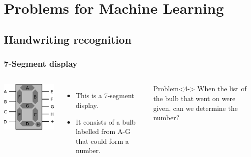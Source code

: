 \documentclass[aspectratio=169]{beamer}
\begin{document}
\section{Problems for Machine Learning}

\subsection{Handwriting recognition}

\begin{frame}
	\frametitle{7-Segment display}
	\begin{columns}
		\includegraphics[width=1.0\textwidth]{imgs/7seg.png}
		\begin{itemize}
			\item<2-> This is a 7-segment display.
			\item<3-> It consists of a bulb labelled from A-G that could form a number.
		\end{itemize}
		\begin{block}{Problem}<4->
			When the list of the bulb that went on were given, can we determine the number?
		\end{block}
	\end{columns}
\end{frame}
\end{document}
